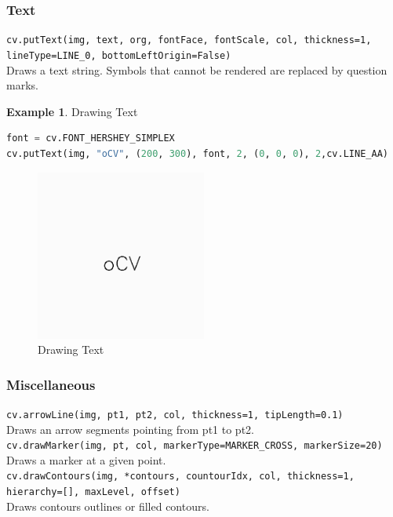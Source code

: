 \documentclass{article}
\theoremstyle{definition}
\newtheorem{ex}{Example}[subsection]
\theoremstyle{remark}
\newcommand{\func}[2]{\noindent\lstinline{#1}\\#2}
\begin{document}
\subsubsection{Text}

\func{cv.putText(img, text, org, fontFace, fontScale, col, thickness=1, lineType=LINE_0, bottomLeftOrigin=False)}{Draws a text string. Symbols that cannot be rendered are replaced by question marks.}

\begin{ex} Drawing Text
\begin{lstlisting}[language=Python]
font = cv.FONT_HERSHEY_SIMPLEX
cv.putText(img, "oCV", (200, 300), font, 2, (0, 0, 0), 2,cv.LINE_AA)
\end{lstlisting}
\begin{figure}[h!]
    \centering
    \includegraphics[width=0.5\textwidth]{opencv_text}
    \caption{Drawing Text}
    \label{fig:ocv_drw_txt}
\end{figure}
\end{ex}

\subsubsection{Miscellaneous}

\func{cv.arrowLine(img, pt1, pt2, col, thickness=1, tipLength=0.1)}{Draws an arrow segments pointing from pt1 to pt2.\\}

\func{cv.drawMarker(img, pt, col, markerType=MARKER_CROSS, markerSize=20)}{Draws a marker at a given point.\\}

\func{cv.drawContours(img, *contours, countourIdx, col, thickness=1, hierarchy=[], maxLevel, offset)}{Draws contours outlines or filled contours.\\}


\break
\end{document}
